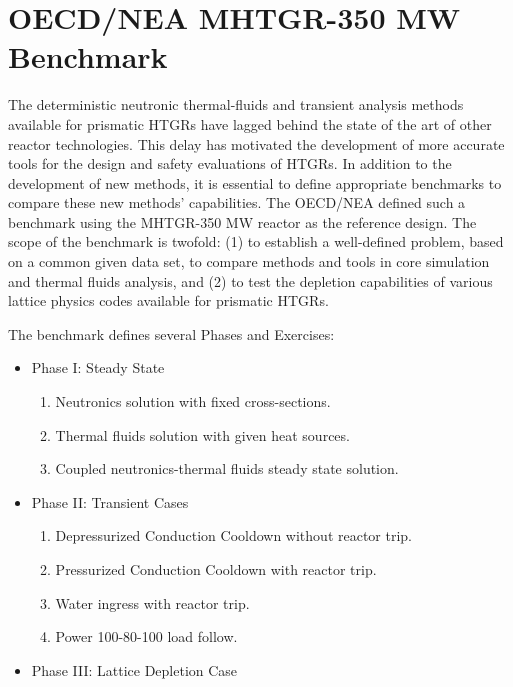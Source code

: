 \documentclass[11pt,letterpaper]{article}
\begin{document}

\section{OECD/NEA MHTGR-350 MW Benchmark}

The deterministic neutronic thermal-fluids and transient analysis methods available for prismatic \glspl{HTGR} have lagged behind the state of the art of other reactor technologies.
This delay has motivated the development of more accurate tools for the design and safety evaluations of \glspl{HTGR}.
In addition to the development of new methods, it is essential to define appropriate benchmarks to compare these new methods' capabilities.
The \gls{OECD}/\gls{NEA} defined such a benchmark \cite{oecd_nea_benchmark_2017} using the \gls{MHTGR}-350 MW reactor \cite{silady_licensing_1988} as the reference design.
The scope of the benchmark is twofold: (1) to establish a well-defined problem, based on a common given data set, to compare methods and tools in core simulation and thermal fluids analysis, and (2) to test the depletion capabilities of various lattice physics codes available for prismatic \glspl{HTGR}.

The benchmark defines several Phases and Exercises:

\begin{itemize}
        \item Phase I: Steady State
        \begin{enumerate}
            \item Neutronics solution with fixed cross-sections. 
            \item Thermal fluids solution with given heat sources.
            \item Coupled neutronics-thermal fluids steady state solution.
        \end{enumerate}

        \item Phase II: Transient Cases
        \begin{enumerate}
            \item Depressurized Conduction Cooldown without reactor trip.
            \item Pressurized Conduction Cooldown with reactor trip.
            \item Water ingress with reactor trip.
            \item Power 100-80-100 load follow.
        \end{enumerate}

        \item Phase III: Lattice Depletion Case
\end{itemize}
\end{document}
